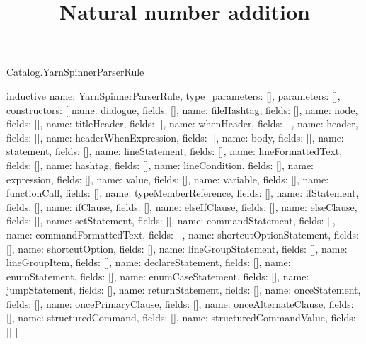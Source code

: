 \begin{lexlean}{Catalog.YarnSpinnerParserRule}
\title{Natural number addition}
\begin{semanticmodule}
inductive{
  name: YarnSpinnerParserRule,
  type_parameters: [],
  parameters: [],
  constructors: [
    {name: dialogue, fields: []},
    {name: fileHashtag, fields: []},
    {name: node, fields: []},
    {name: titleHeader, fields: []},
    {name: whenHeader, fields: []},
    {name: header, fields: []},
    {name: headerWhenExpression, fields: []},
    {name: body, fields: []},
    {name: statement, fields: []},
    {name: lineStatement, fields: []},
    {name: lineFormattedText, fields: []},
    {name: hashtag, fields: []},
    {name: lineCondition, fields: []},
    {name: expression, fields: []},
    {name: value, fields: []},
    {name: variable, fields: []},
    {name: functionCall, fields: []},
    {name: typeMemberReference, fields: []},
    {name: ifStatement, fields: []},
    {name: ifClause, fields: []},
    {name: elseIfClause, fields: []},
    {name: elseClause, fields: []},
    {name: setStatement, fields: []},
    {name: commandStatement, fields: []},
    {name: commandFormattedText, fields: []},
    {name: shortcutOptionStatement, fields: []},
    {name: shortcutOption, fields: []},
    {name: lineGroupStatement, fields: []},
    {name: lineGroupItem, fields: []},
    {name: declareStatement, fields: []},
    {name: enumStatement, fields: []},
    {name: enumCaseStatement, fields: []},
    {name: jumpStatement, fields: []},
    {name: returnStatement, fields: []},
    {name: onceStatement, fields: []},
    {name: oncePrimaryClause, fields: []},
    {name: onceAlternateClause, fields: []},
    {name: structuredCommand, fields: []},
    {name: structuredCommandValue, fields: []}
  ]
}
\end{semanticmodule}
\end{lexlean}
